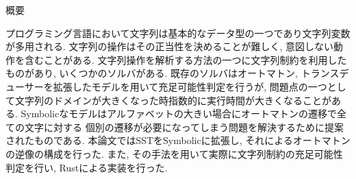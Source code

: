 \documentclass[uplatex,dvipdfmx,a4j]{jsreport}
\begin{document}
  概要

  プログラミング言語において文字列は基本的なデータ型の一つであり文字列変数が多用される.
  文字列の操作はその正当性を決めることが難しく, 意図しない動作を含むことがある.
  文字列操作を解析する方法の一つに文字列制約を利用したものがあり, いくつかのソルバがある.
  既存のソルバはオートマトン, トランスデューサーを拡張したモデルを用いて充足可能性判定を行うが,
  問題点の一つとして文字列のドメインが大きくなった時指数的に実行時間が大きくなることがある.
  Symbolicなモデルはアルファベットの大きい場合にオートマトンの遷移で全ての文字に対する
  個別の遷移が必要になってしまう問題を解決するために提案されたものである.
  本論文ではSSTをSymbolicに拡張し, それによるオートマトンの逆像の構成を行った.
  また, その手法を用いて実際に文字列制約の充足可能性判定を行い, Rustによる実装を行った.
\end{document}
